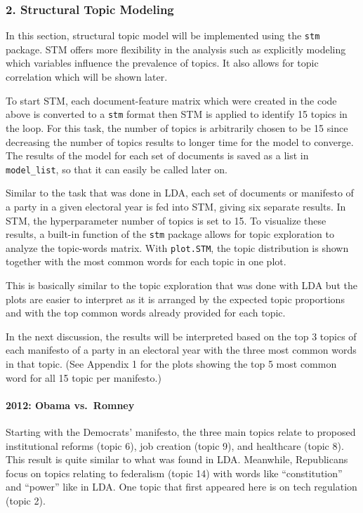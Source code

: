 \documentclass[
]{article}
\begin{document}
\hypertarget{structural-topic-modeling}{%
\subsubsection{2. Structural Topic
Modeling}\label{structural-topic-modeling}}

In this section, structural topic model will be implemented using the
\texttt{stm} package. STM offers more flexibility in the analysis such
as explicitly modeling which variables influence the prevalence of
topics. It also allows for topic correlation which will be shown later.

To start STM, each document-feature matrix which were created in the
code above is converted to a \texttt{stm} format then STM is applied to
identify 15 topics in the loop. For this task, the number of topics is
arbitrarily chosen to be 15 since decreasing the number of topics
results to longer time for the model to converge. The results of the
model for each set of documents is saved as a list in
\texttt{model\_list}, so that it can easily be called later on.

Similar to the task that was done in LDA, each set of documents or
manifesto of a party in a given electoral year is fed into STM, giving
six separate results. In STM, the hyperparameter number of topics is set
to 15. To visualize these results, a built-in function of the
\texttt{stm} package allows for topic exploration to analyze the
topic-words matrix. With \texttt{plot.STM}, the topic distribution is
shown together with the most common words for each topic in one plot.

This is basically similar to the topic exploration that was done with
LDA but the plots are easier to interpret as it is arranged by the
expected topic proportions and with the top common words already
provided for each topic.

In the next discussion, the results will be interpreted based on the top
3 topics of each manifesto of a party in an electoral year with the
three most common words in that topic. (See Appendix 1 for the plots
showing the top 5 most common word for all 15 topic per manifesto.)

\hypertarget{obama-vs.-romney-1}{%
\paragraph{2012: Obama vs.~Romney}\label{obama-vs.-romney-1}}

Starting with the Democrats' manifesto, the three main topics relate to
proposed institutional reforms (topic 6), job creation (topic 9), and
healthcare (topic 8). This result is quite similar to what was found in
LDA. Meanwhile, Republicans focus on topics relating to federalism
(topic 14) with words like ``constitution'' and ``power'' like in LDA.
One topic that first appeared here is on tech regulation (topic 2).
\end{document}
